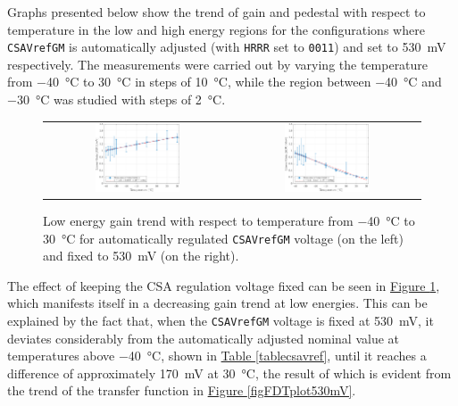 Graphs presented below show the trend of gain and pedestal with respect to temperature in the low and high energy regions for the configurations where \texttt{CSAVrefGM} is automatically adjusted (with \texttt{HRRR} set to \texttt{0011}) and set to \SI{530}{\milli\volt} respectively. The measurements were carried out by varying the temperature from \SI{-40}{\celsius} to \SI{30}{\celsius} in steps of \SI{10}{\celsius}, while the region between \SI{-40}{\celsius} and \SI{-30}{\celsius} was studied with steps of \SI{2}{\celsius}. 

\begin{figure}[h!]
    \centering
    \begin{tabular}{cc}
        \includegraphics[width=0.475\textwidth]{Images/chap1/results/gain_pedestal/low_energy_gain_auto_0011.pdf} & \includegraphics[width=0.475\textwidth]{Images/chap1/results/gain_pedestal/low_energy_gain_530mV.pdf}\\
    \end{tabular}
    \caption{Low energy gain trend with respect to temperature from \SI{-40}{\celsius} to \SI{30}{\celsius} for automatically regulated \texttt{CSAVrefGM} voltage (on the left) and fixed to \SI{530}{\milli\volt} (on the right).}
    \label{figFDTgainLowEnergies}
\end{figure}

The effect of keeping the CSA regulation voltage fixed can be seen in \hyperref[figFDTgainLowEnergies]{Figure \ref{figFDTgainLowEnergies}}, which manifests itself in a decreasing gain trend at low energies. This can be explained by the fact that, when the \texttt{CSAVrefGM} voltage is fixed at \SI{530}{\milli\volt}, it deviates considerably from the automatically adjusted nominal value at temperatures above \SI{-40}{\celsius}, shown in \hyperref[tablecsavref]{Table \ref{tablecsavref}}, until it reaches a difference of approximately \SI{170}{\milli\volt} at \SI{30}{\celsius}, the result of which is evident from the trend of the transfer function in \hyperref[figFDTplot530mV]{Figure \ref{figFDTplot530mV}}.

